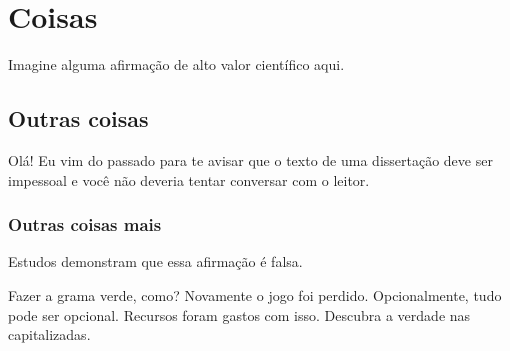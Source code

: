 \documentclass[embeddedlogo]{../ufsc-thesis-rn46-2019}
\begin{document}
\section{Coisas}
\label{sec:stuff}
Imagine alguma afirmação de alto valor científico aqui.

\subsection{Outras coisas}
\label{sec:more}
Olá! Eu vim do passado para te avisar que o texto de uma dissertação deve ser
impessoal e você não deveria tentar conversar com o leitor.

\subsubsection{Outras coisas mais}
\label{sec:yet-more}
Estudos demonstram que essa afirmação é falsa.

\label{sec:yet-another}
Fazer a grama verde, como? Novamente o jogo foi perdido. Opcionalmente, tudo
pode ser opcional. Recursos foram gastos com isso. Descubra a verdade nas
capitalizadas.


\postextual

\end{document}
